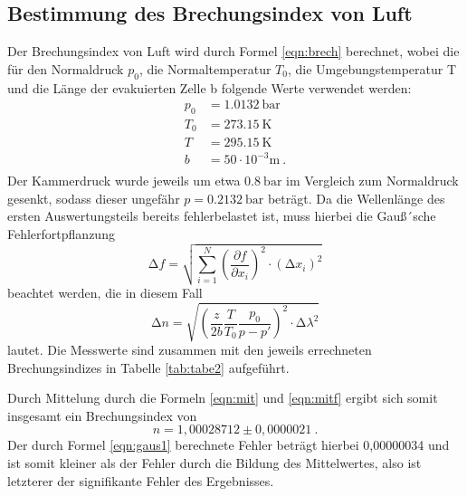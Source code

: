 \subsection{Bestimmung des Brechungsindex von Luft}
Der Brechungsindex von Luft wird durch Formel \ref{eqn:brech} berechnet, wobei die für
den Normaldruck $p_0$, die Normaltemperatur $T_0$, die Umgebungstemperatur T und die
Länge der evakuierten Zelle b folgende Werte verwendet werden:
\begin{align*}
  p_0 &= \SI{1.0132}{\bar} \\
  T_0 &= \SI{273.15}{\kelvin} \\
  T &= \SI{295.15}{\kelvin} \\
  b &=  50 \cdot 10^{-3} \si{\meter} \: .\\
\end{align*}
Der Kammerdruck wurde jeweils um etwa $\SI{0.8}{\bar}$ im Vergleich zum Normaldruck
gesenkt, sodass dieser
ungefähr $ p = \SI{0.2132}{\bar}$ beträgt.
Da die Wellenlänge des ersten Auswertungsteils bereits fehlerbelastet ist, muss
hierbei die Gauß´sche Fehlerfortpflanzung
\begin{equation}
  \increment f = \sqrt{ \sum_{i=1}^N \left( \frac{\partial f}{\partial x_i}\right)^2
  \cdot (\increment x_i)^2  }
  \label{eqn:gaus}
\end{equation}
beachtet werden, die in diesem Fall
\begin{equation}
  \increment n= \sqrt{\left(\frac{ z}{2b}\frac{T}{T_{0}}\frac{p_{0}}{p-p'}\right)^2\cdot
  \increment \lambda^2}
  \label{eqn:gaus1}
\end{equation}
lautet.
Die Messwerte sind zusammen mit den jeweils errechneten Brechungsindizes in Tabelle
\ref{tab:tabe2} aufgeführt.

Durch Mittelung durch die Formeln \ref{eqn:mit} und \ref{eqn:mitf} ergibt sich somit insgesamt
ein Brechungsindex von
\begin{equation*}
  n = 1,00028712 \pm 0,0000021 \: .
\end{equation*}
Der durch Formel \ref{eqn:gaus1} berechnete Fehler beträgt hierbei 0,00000034 und ist somit kleiner
als der Fehler durch die Bildung des Mittelwertes, also ist letzterer der signifikante Fehler des Ergebnisses.
